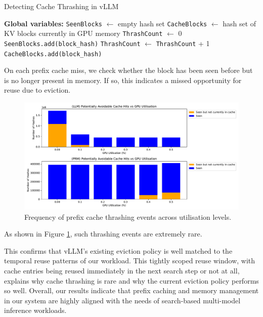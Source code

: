 \documentclass[12pt,twoside]{report}
\begin{document}
\begin{algorithm}[H]\label{alg:cachethrashingdetection}
\caption{Detecting Cache Thrashing in vLLM}
\begin{algorithmic}[1]
\State \textbf{Global variables:}
\State \quad \texttt{SeenBlocks} $\gets$ empty hash set
\State \quad \texttt{CacheBlocks} $\gets$ hash set of KV blocks currently in GPU memory
\State \quad \texttt{ThrashCount} $\gets$ 0
    \State \texttt{SeenBlocks.add(block\_hash)} 
  \Else
      \State \texttt{ThrashCount} $\gets$ \texttt{ThrashCount} + 1 
    \EndIf
  \EndIf
  \State \texttt{CacheBlocks.add(block\_hash)} 
\EndFunction
\end{algorithmic}
\end{algorithm}

On each prefix cache miss, we check whether the block has been seen before but is no longer present in memory. 
If so, this indicates a missed opportunity for reuse due to eviction.

\begin{figure}[htbp]
\centering
\includegraphics[width=\textwidth]{figures/kv_thrashing_stats.pdf}
\caption{Frequency of prefix cache thrashing events across utilisation levels.}
\label{fig:cache_thrashing}
\end{figure}

As shown in Figure \ref{fig:cache_thrashing}, such thrashing events are extremely rare. 

This confirms that vLLM's existing eviction policy is well matched to the temporal reuse patterns of our workload.
This tightly scoped reuse window, with cache entries being reused immediately in the next search step or not at all, explains why cache thrashing is rare and why the current eviction policy performs so well. 
Overall, our results indicate that prefix caching and memory management in our system are highly aligned with the needs of search-based multi-model inference workloads.
\end{document}
